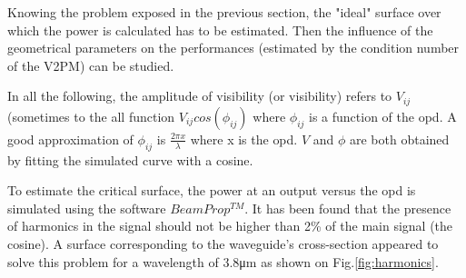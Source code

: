 Knowing the problem exposed in the previous section, the "ideal" surface over which the power is calculated has to be estimated. Then the influence of the geometrical parameters on the performances (estimated by the condition number of the \gls{V2PM}) can be studied. 

In all the following, the amplitude of visibility (or visibility) refers to $V_{ij}$ (sometimes to the all function $V_{ij}cos(\phi_{ij})$ where $\phi_{ij}$ is a function of the \gls{opd}. A good approximation of $\phi_{ij}$ is $\frac{2\pi x}{\lambda}$ where x is the \gls{opd}. $V$ and $\phi$ are both obtained by fitting the simulated curve with a cosine.


To estimate the critical surface, the power at an output versus the \gls{opd} is simulated using the software $BeamProp^{TM}$. It has been found that the presence of harmonics in the signal should not be higher than 2\% of the main signal (the cosine). A surface corresponding to the waveguide's cross-section appeared to solve this problem for a wavelength of 3.8\si{\micro\meter} as shown on Fig.\ref{fig:harmonics}.   


